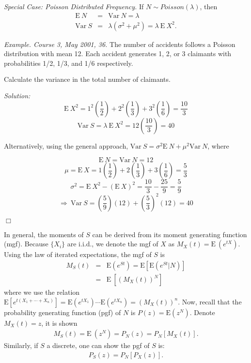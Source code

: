 \documentclass[12pt,letterpaper]{article}
\begin{document}


\noindent \textit{Special Case: Poisson Distributed Frequency.} If $N \sim Poisson (\lambda)$, then
\begin{eqnarray*}
\mathrm{E~}N &=& \mathrm{Var~}N = \lambda\\
\mathrm{Var~}S &=& \lambda (\sigma^2 + \mu^2) = \lambda ~\mathrm{E~} X^2 .
\end{eqnarray*}

\noindent \textit{Example. Course 3, May 2001, 36.} The number of accidents follows a Poisson distribution with mean 12. Each accident generates 1, 2, or 3 claimants with probabilities 1/2, 1/3, and 1/6 respectively.

Calculate the variance in the total number of claimants.

\bigskip

\noindent \textit{Solution:}
$$\mathrm{E~}X^2 = 1^2 \left( \frac{1}{2}\right) + 2^2\left(\frac{1}{3} \right) + 3^2\left(\frac{1}{6}\right)
= \frac{10}{3}$$
$$\mathrm{Var~}S = \lambda \ \mathrm{E~}X^2 = 12\left(\frac{10}{3}\right) = 40$$

\noindent Alternatively, using the general approach, $\mathrm{Var~}S = \sigma^2 \mathrm{E~}N + \mu^2 \mathrm{Var~}N$, where

$$\mathrm{E~}N = \mathrm{Var~}N = 12$$
$$\mu = \mathrm{E~}X = 1\left(\frac{1}{2}\right) + 2\left(\frac{1}{3}\right) + 3\left(\frac{1}{6}\right)
= \frac{5}{3}$$
$$\sigma^2 = \mathrm{E~}X^2 - (\mathrm{E~}X)^2 = \frac{10}{3} - \frac{25}{9}
= \frac{5}{9}$$
$$\Rightarrow \ \mathrm{Var~}S = \left(\frac{5}{9}\right)\left(12\right) + \left(\frac{5}{3}\right)^2\left(12\right) = 40$$
\begin{flushright}$\Box$\end{flushright}


In general, the moments of $S$ can be derived from its moment generating function (mgf). Because $\{X_i\}$ are i.i.d., we denote the mgf of $X$ as $M_{X}(t) = \mathrm{E~}(e^{tX})$. Using the law of iterated expectations, the mgf of $S$ is
\begin{eqnarray*}
M_{S}(t) &=& \mathrm{E}(e^{St})=\mathrm{E}[\mathrm{E}(e^{St}|N)]\\
&=& \mathrm{E~}[(M_{X}(t))^N]
\end{eqnarray*}
where we use the relation $\mathrm{E}[e^{t(X_1+\cdots+X_n)}] = \mathrm{E}(e^{tX_1})\cdots\mathrm{E}(e^{tX_n})
= (M_{X}(t))^n$. Now, recall that the probability generating function (pgf) of $N$ is $P(z) = \mathrm{E}(z^N)$. Denote $M_{X}(t)=z$, it is shown
\begin{eqnarray*}
M_{S}(t) = \mathrm{E~}(z^N)  = P_{N}(z) = P_{N}[M_{X}(t)].
\end{eqnarray*}
Similarly, if $S$ a discrete, one can show the pgf of $S$ is:
\begin{eqnarray*}
P_{S}(z) = P_{N}[P_{X}(z)].
\end{eqnarray*}
\end{document}
